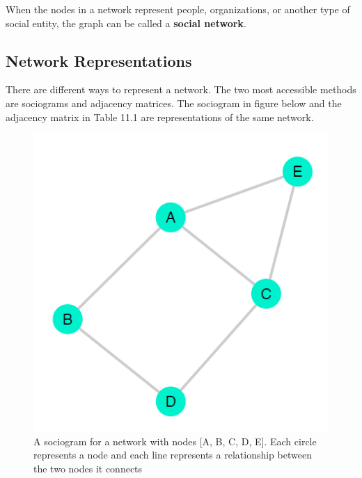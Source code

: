 \documentclass{book}
\begin{document}
When the nodes in a network represent people, organizations, or another type
of social entity, the graph can be called a \textbf{social network}.

\hypertarget{network-representations}{%
\subsection{Network Representations}\label{network-representations}}

There are different ways to represent a network. The two most accessible
methods are sociograms and adjacency matrices. The sociogram in figure below
and the adjacency matrix in Table 11.1 are representations of the same
network.

\begin{figure}
\centering
\includegraphics{images/social-networks/11-1.png}
\caption{A sociogram for a network with nodes {[}A, B, C, D, E{]}. Each circle
represents a node and each line represents a relationship between the two
nodes it connects}
\end{figure}
\end{document}
